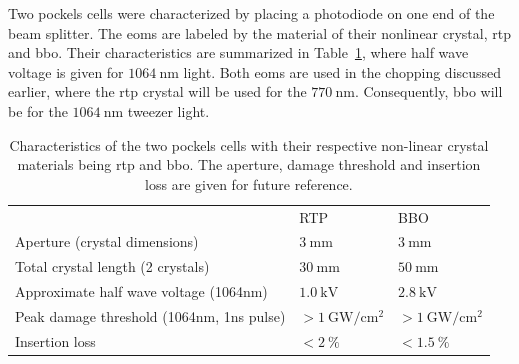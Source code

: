 \begin{figure}[t]%
\end{figure}

Two  pockels cells were characterized by placing a photodiode on one end of the beam splitter. The \acp{eom} are labeled by the material of their nonlinear crystal, \ac{rtp} and \ac{bbo}. Their characteristics are summarized in Table~\ref{tbl:eom_crystals}, where half wave voltage is given for $\SI{1064}{\nano\meter}$ light. Both \acp{eom} are used in the chopping discussed earlier, where the \ac{rtp} crystal will be used for the $\SI{770}{\nano\meter}$. Consequently, \ac{bbo} will be for the $\SI{1064}{\nano\meter}$ tweezer light.

\begin{table}%
\label{tbl:eom_crystals}
\centering
\begin{tabular}{p{6cm} l l}
	\toprule \toprule
                                                                                     & RTP                                       & BBO \\ \thickhline%
Aperture (crystal dimensions)                                                        & $\SI{3}{\milli\meter}$                    & $\SI{3}{\milli\meter}$   \\ \midrule
Total crystal length (2 crystals)                                                    & $\SI{30}{\milli\meter}$                   & $\SI{50}{\milli\meter}$    \\ \midrule
Approximate half wave voltage \newline (1064nm)    & $\SI{1.0}{\kilo \volt}$                   & $\SI{2.8}{\kilo\volt}$    \\ \midrule
Peak damage threshold (1064nm, \newline 1ns pulse) & $> \SI{1}{\giga \watt \per \cm \squared}$ & $> \SI{1}{\giga \watt \per \cm \squared}$   \\ \midrule
Insertion loss                                                                       & $< \SI{2}{\percent}$                      & $< \SI{1.5}{\percent} $ \\ \bottomrule \bottomrule
\end{tabular}
\caption{Characteristics of the two pockels cells with their respective non-linear crystal materials being \ac{rtp} and \ac{bbo}. The aperture, damage threshold and insertion loss are given for future reference.}
\end{table}


